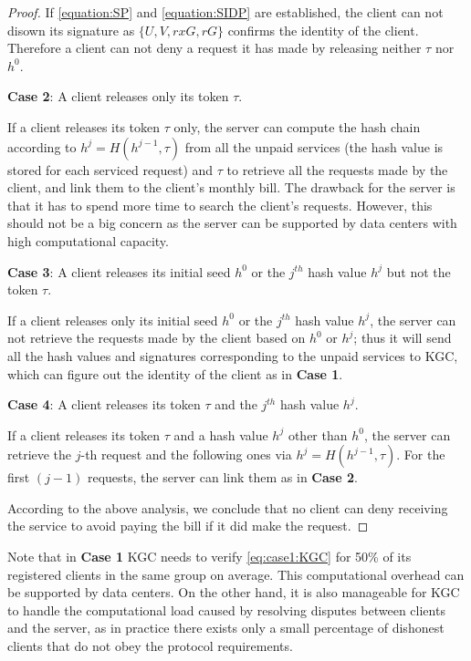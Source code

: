 \documentclass[letterpaper,12pt]{article}
\begin{document}
\begin{proof}
If  \eqref{equation:SP} and \eqref{equation:SIDP} are established, the client can not disown its signature as $\{U, V, rxG, rG\}$ confirms the identity of the client. Therefore a client can not deny a request it has made by releasing neither $\tau$ nor $h^0$.

\textbf{Case 2}: A client releases only its token $\tau$.

If a client releases its token $\tau$ only, the server can compute the hash chain according to $h^j=H(h^{j-1},\tau)$ from all the unpaid services (the hash value is stored for each serviced request) and $\tau$ to retrieve all the requests made by the client, and link them to the client's monthly bill. The drawback for the server is that it has to spend more time to search the client's requests. However, this should not be a big concern as the server can be supported by data centers with high computational capacity.

\textbf{Case 3}: A client releases its initial seed $h^0$ or the $j^{th}$ hash value $h^j$ but not the token $\tau$.

If a client releases only its initial seed $h^0$  or the $j^{th}$ hash value $h^j$, the server can not retrieve the requests made by the client based on $h^0$ or $h^j$; thus it will send all the hash values and signatures corresponding to the unpaid services to KGC, which can figure out the identity of the client as in \textbf{Case 1}.

 \textbf{Case 4}: A client releases its token $\tau$ and the $j^{th}$ hash value $h^j$.

If a client releases its token $\tau$ and a hash value $h^j$ other than $h^0$, the server can retrieve the $j$-th request and the following ones via $h^j=H(h^{j-1},\tau)$. For the first $(j-1)$ requests, the server can link them as in \textbf{Case 2}.

According to the above analysis, we conclude that no client can deny receiving the service to avoid paying the bill if it did make the request.
\end{proof}

Note that in \textbf{Case 1} KGC needs to verify \eqref{eq:case1:KGC} for 50\% of its registered clients in the same group on average. This computational overhead can be supported by data centers. On the other hand, it is also manageable for KGC to handle the computational load caused by resolving disputes between clients and the server, as in practice there exists only a small percentage of dishonest clients that do not obey the protocol requirements.
\end{document}
